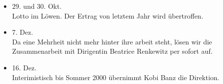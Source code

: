 \begin{history}
\begin{itemize}
        \item[]29. und 30. Okt.\\
        Lotto im Löwen. Der Ertrag von letztem Jahr wird übertroffen.

        \item[]7. Dez.\\
        Da eine Mehrheit nicht mehr hinter ihre arbeit steht, lösen wir die
        Zusammenarbeit mit Dirigentin Beatrice Renkewitz per sofort auf.

        \item[]16. Dez.\\
        Interimistisch bis Sommer 2000 übernimmt Kobi Banz die Direktion.

    \end{itemize}

\end{history}

